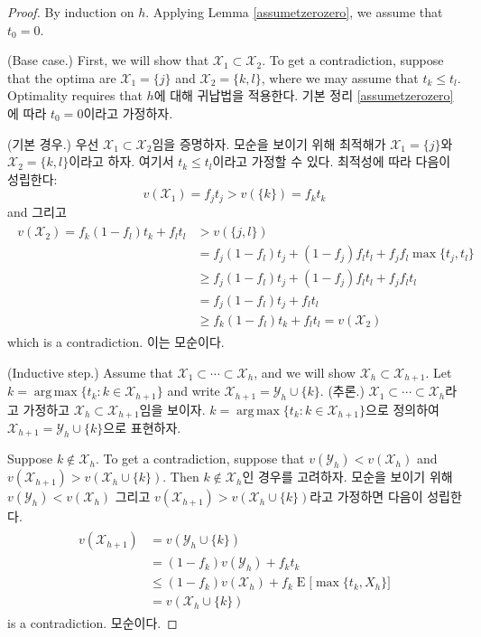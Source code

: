 \documentclass[11pt]{article} %
\DeclareMathOperator*{\argmax}{arg\,max}
\theoremstyle{definition}
\theoremstyle{definition}
\begin{document}
\begin{proof}\ifen
By induction on $h$. Applying Lemma \ref{assumetzerozero}, we assume that $t_0 = 0$. 

(Base case.) First, we will show that $\mathcal{X}_1 \subset \mathcal{X}_2$. To get a contradiction, suppose that the optima are $\mathcal{X}_1 = \{j\}$ and $\mathcal{X}_2 = \{k, l\}$, where we may assume that $t_k \leq t_l$. Optimality requires that
\else $h$에 대해 귀납법을 적용한다. 기본 정리 \ref{assumetzerozero}에 따라 $t_0 = 0$이라고 가정하자. 

(기본 경우.) 우선 $\mathcal{X}_1 \subset \mathcal{X}_2$임을 증명하자. 모순을 보이기 위해 최적해가 $\mathcal{X}_1 = \{j\}$와 $\mathcal{X}_2 = \{k, l\}$이라고 하자. 여기서 $t_k \leq t_l$이라고 가정할 수 있다. 최적성에 따라 다음이 성립한다:
\fi
\begin{equation}v(\mathcal{X}_1 )  = f_j t_j > v(\{k\}) = f_k t_k\end{equation}
\ifen and \else 그리고\fi
\begin{align}
\begin{split}
v(\mathcal{X}_2) =  f_k (1- f_l) t_k + f_l t_l &> v(\{j, l\}) \\
& = f_j (1- f_l) t_j + (1- f_j) f_l t_l + f_j f_l \max\{t_j, t_l\} \\
&\geq  f_j (1- f_l) t_j + (1- f_j) f_l t_l + f_j f_l  t_l \\
&= f_j (1- f_l) t_j + f_l t_l  \\
&\geq f_k (1- f_l) t_k + f_l t_l  = v(\mathcal{X}_2)
\end{split}
\end{align}
\ifen which is a contradiction. 
\else 이는 모순이다.\fi

\ifen (Inductive step.) Assume that $\mathcal{X}_1 \subset \cdots \subset \mathcal{X}_h$, and we will show $\mathcal{X}_h \subset \mathcal{X}_{h+1}$. Let $k = \argmax\{ t_k: k \in \mathcal{X}_{h+1}\}$ and write $\mathcal{X}_{h+1} = \mathcal{Y}_{h} \cup \{k\}$.
\else (추론.) $\mathcal{X}_1 \subset \cdots \subset \mathcal{X}_h$라고 가정하고 $\mathcal{X}_h \subset \mathcal{X}_{h+1}$임을 보이자. $k = \argmax\{ t_k: k \in \mathcal{X}_{h+1}\}$으로 정의하여 $\mathcal{X}_{h+1} = \mathcal{Y}_{h} \cup \{k\}$으로 표현하자.\fi

\ifen Suppose $k \notin \mathcal{X}_h$. To get a contradiction, suppose that $v(\mathcal{Y}_h) < v(\mathcal{X}_h)$ and  $v(\mathcal{X}_{h+1}) > v(\mathcal{X}_h \cup \{k\})$. Then
\else $k \notin \mathcal{X}_h$인 경우를 고려하자. 모순을 보이기 위해 $v(\mathcal{Y}_h) < v(\mathcal{X}_h)$ 그리고 $v(\mathcal{X}_{h+1}) > v(\mathcal{X}_h \cup \{k\})$라고 가정하면 다음이 성립한다. \fi
\begin{align}
\begin{split}
v(\mathcal{X}_{h+1})&= v(\mathcal{Y}_{h} \cup \{k\}) \\
&= (1 - f_k) v(\mathcal{Y}_h) + f_k t_k \\
&\leq (1 - f_k) v(\mathcal{X}_h) + f_k \operatorname{E}\bigl[ \max\{t_k, X_h\}\bigr]\\
&=  v(\mathcal{X}_h\cup \{k\})
\end{split}
\end{align}
\ifen is a contradiction.
\else 모순이다.\fi


\end{proof}
\end{document}
